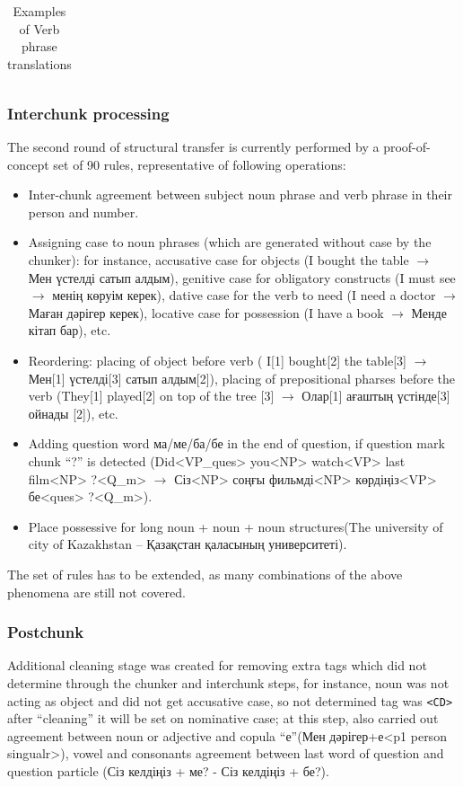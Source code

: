 \documentclass[11pt]{article}
\begin{document}
\begin{table}
\begin{tabular}{|l|l|l|l|}
     
  \end{tabular}
  \caption{Examples of Verb phrase translations}
  \label{table:vps}
\end{table}

\subsubsection{Interchunk processing}

The second round of structural transfer is currently performed by a proof-of-concept set of 90 rules, representative of following operations:
\begin{itemize}
\item Inter-chunk agreement between subject noun phrase and verb phrase in their person and number.
\item Assigning case to noun phrases (which are generated without case by the chunker): for instance, 
  accusative case for objects (I bought the table $\rightarrow$ Мен үстелді  сатып алдым), genitive case for 
  obligatory constructs (I must see $\rightarrow$ менің көруім керек),  dative case for the verb to 
  need (I need a doctor $\rightarrow$Маған дәрігер керек), locative case for 
  possession (I have a book $\rightarrow$ Менде кітап бар), etc.
\item Reordering: placing of object before verb ( I[1] bought[2] the table[3] $\rightarrow$ Мен[1] үстелді[3] сатып алдым[2]), 
  placing of prepositional pharses before the verb  (They[1] played[2] on top of the tree [3] $\rightarrow$ Олар[1] ағаштың үстінде[3] ойнады [2]), etc.
\item Adding question word ма/ме/ба/бе in the end of question, if question mark chunk ``?'' is detected (Did<VP\_ques> you<NP> watch<VP> last film<NP> ?<Q\_m> $\rightarrow$ Сіз<NP> соңғы фильмді<NP> көрдіңіз<VP> бе<ques> ?<Q\_m>).
\item Place possessive for long noun + noun + noun structures(The university of city of Kazakhstan -- Қазақстан қаласының университеті).
\end{itemize}

The set of rules has to be extended, as many combinations of the above phenomena are still not covered.

\subsubsection{Postchunk}

Additional cleaning stage was created for removing extra tags which did not determine through the chunker and 
interchunk steps, for instance, noun was not acting as object and did not get accusative case, so not determined 
tag was \texttt{<CD>} after ``cleaning'' it will be set on nominative case; at this step, also carried out 
agreement between noun or adjective and copula ``е''(Мен дәрігер+е<p1 person singualr>), vowel and consonants 
agreement between last word of question and question particle (Сіз келдіңіз + ме? - Сіз келдіңіз + бе?).
\end{document}
